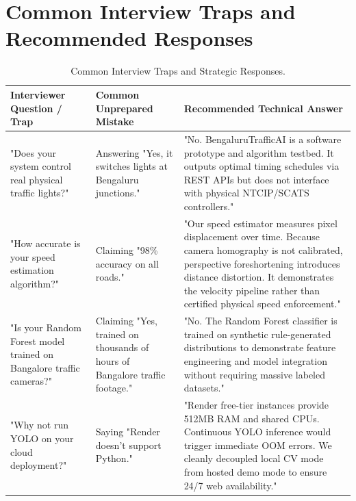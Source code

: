 \documentclass[11pt,a4paper,oneside]{report}
\begin{document}
\section{Common Interview Traps and Recommended Responses}
\label{sec:glossary_traps}

\begin{table}[H]
\centering
\small
\begin{tabularx}{\textwidth}{p{4.2cm} p{4.5cm} X}
\toprule
\textbf{Interviewer Question / Trap} & \textbf{Common Unprepared Mistake} & \textbf{Recommended Technical Answer} \\
\midrule
"Does your system control real physical traffic lights?" & Answering "Yes, it switches lights at Bengaluru junctions." & "No. BengaluruTrafficAI is a software prototype and algorithm testbed. It outputs optimal timing schedules via REST APIs but does not interface with physical NTCIP/SCATS controllers." \\
\midrule
"How accurate is your speed estimation algorithm?" & Claiming "98\% accuracy on all roads." & "Our speed estimator measures pixel displacement over time. Because camera homography is not calibrated, perspective foreshortening introduces distance distortion. It demonstrates the velocity pipeline rather than certified physical speed enforcement." \\
\midrule
"Is your Random Forest model trained on Bangalore traffic cameras?" & Claiming "Yes, trained on thousands of hours of Bangalore traffic footage." & "No. The Random Forest classifier is trained on synthetic rule-generated distributions to demonstrate feature engineering and model integration without requiring massive labeled datasets." \\
\midrule
"Why not run YOLO on your cloud deployment?" & Saying "Render doesn't support Python." & "Render free-tier instances provide 512MB RAM and shared CPUs. Continuous YOLO inference would trigger immediate OOM errors. We cleanly decoupled local CV mode from hosted demo mode to ensure 24/7 web availability." \\
\bottomrule
\end{tabularx}
\caption{Common Interview Traps and Strategic Responses.}
\label{tab:glossary_traps}
\end{table}

\end{document}
